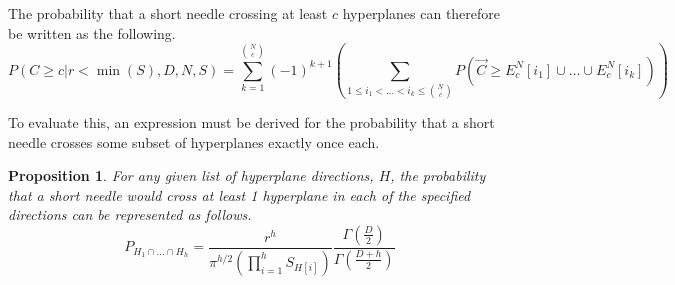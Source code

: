 \documentclass{article}
\newtheorem{proposition}{Proposition}
\begin{document}
The probability that a short needle crossing at least $c$ hyperplanes can therefore be written as the following.
\begin{equation}
	P(C\ge c|r<\min(S), D, N, S) = \sum_{k=1}^{N\choose c} (-1)^{k+1}\left(\sum_{1\le i_1 < \hdots < i_k \le {N\choose c}}P(\vec{C}\ge E_c^N[i_1]\cup \hdots \cup E_c^N[i_k]) \right) \label{eq:combo probs}
\end{equation}

To evaluate this, an expression must be derived for the probability that a short needle crosses some subset
of hyperplanes exactly once each.

\begin{proposition}
	For any given list of hyperplane directions, $H$, the probability that a short needle would cross
	at least 1 hyperplane in each of the specified directions can be represented as follows.
	\begin{equation}
		P_{H_1 \cap \hdots \cap H_h} = \frac{r^h }{ \pi^{h/2} (\prod_{i=1}^h S_{H[i]}) }\frac{\Gamma(\frac{D}{2})}{\Gamma(\frac{D+h}{2})}
	\end{equation}
\end{proposition}
\end{document}
